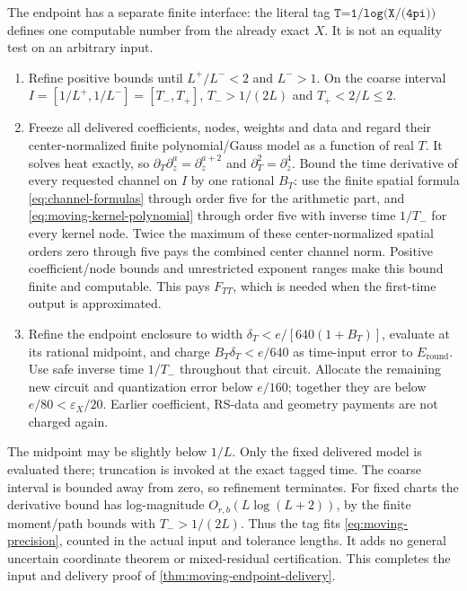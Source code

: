 The endpoint has a separate finite interface: the literal tag
\(\texttt{T=1/log(X/(4pi))}\) defines one computable number from the
already exact \(X\). It is not an equality test on an arbitrary input.
\begin{enumerate}[leftmargin=*,itemsep=.5em]
\item Refine positive bounds until \(L^+/L^-<2\) and \(L^->1\).
On the coarse interval \(I=[1/L^+,1/L^-]=[T_-,T_+]\),
\(T_->1/(2L)\) and \(T_+<2/L\le2\).

\item Freeze all delivered coefficients, nodes, weights and data and
regard their center-normalized finite polynomial/Gauss model as a function
of real \(T\).
It solves heat exactly, so
\(\partial_T\partial_z^a=\partial_z^{a+2}\) and
\(\partial_T^2=\partial_z^4\). Bound the time derivative of every
requested channel on \(I\) by one rational \(B_T\): use the finite spatial
formula \eqref{eq:channel-formulas} through order five for the arithmetic
part, and \eqref{eq:moving-kernel-polynomial} through order five with
inverse time \(1/T_-\) for every kernel node. Twice the maximum of these
center-normalized spatial orders zero through five pays the combined
center channel norm.
Positive coefficient/node bounds and unrestricted exponent ranges make
this bound finite and computable. This pays \(F_{TT}\), which is needed
when the first-time output is approximated.

\item Refine the endpoint enclosure to width
\(\delta_T<e/[640(1+B_T)]\), evaluate at its rational midpoint, and charge
\(B_T\delta_T<e/640\) as time-input error to \(E_{\mathrm{round}}\).
Use safe inverse time \(1/T_-\) throughout that circuit. Allocate the
remaining new circuit and quantization error below \(e/160\); together
they are below \(e/80<\varepsilon_X/20\). Earlier coefficient, RS-data
and geometry payments are not charged again.
\end{enumerate}
The midpoint may be slightly below \(1/L\). Only the fixed delivered
model is evaluated there; truncation is invoked at the exact tagged time.
The coarse interval is bounded away from zero, so refinement terminates.
For fixed charts the derivative bound has log-magnitude
\(O_{r,b}(L\log(L+2))\), by the finite moment/path bounds with
\(T_->1/(2L)\). Thus the tag fits \eqref{eq:moving-precision}, counted
in the actual input and tolerance lengths. It adds no general uncertain
coordinate theorem or mixed-residual certification. This completes the
input and delivery proof of \cref{thm:moving-endpoint-delivery}.

